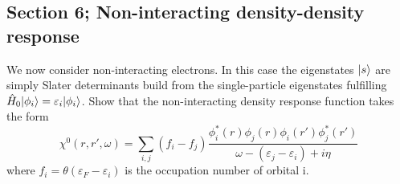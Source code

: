 \subsection{Section 6; Non-interacting density-density response}
\begin{exercise}
We now consider non-interacting electrons. In this case the eigenstates $|s\rangle$ are simply Slater determinants build from the single-particle eigenstates fulfilling $\hat{H}_0|\phi_i\rangle = \varepsilon_i|\phi_i\rangle$. Show that the non-interacting density response function takes the form
\begin{equation}
    \chi^{0}(r,r',\omega) = \sum_{i,j} (f_i-f_j)\dfrac{\phi^{*}_i(r)\phi_j(r)\phi_i(r')\phi^{*}_j(r')}{\omega - (\varepsilon_j - \varepsilon_i) + i\eta}
\end{equation}
where $f_i = \theta(\varepsilon_F-\varepsilon_i)$ is the occupation number of orbital i.
\end{exercise}

